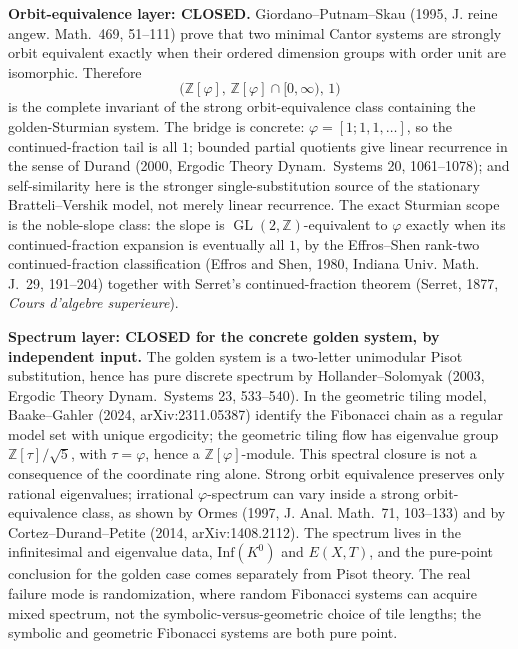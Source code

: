 \documentclass[11pt]{article}
\begin{document}
\textbf{Orbit-equivalence layer: CLOSED.}  Giordano--Putnam--Skau (1995, J. reine angew. Math.\ 469, 51--111) prove that two minimal Cantor systems are strongly orbit equivalent exactly when their ordered dimension groups with order unit are isomorphic.  Therefore
$$
  \bigl(\mathbb Z[\varphi],\,\mathbb Z[\varphi]\cap[0,\infty),\,1\bigr)
$$
is the complete invariant of the strong orbit-equivalence class containing the golden-Sturmian system.  The bridge is concrete: $\varphi=[1;1,1,\dots]$, so the continued-fraction tail is all $1$; bounded partial quotients give linear recurrence in the sense of Durand (2000, Ergodic Theory Dynam.\ Systems 20, 1061--1078); and self-similarity here is the stronger single-substitution source of the stationary Bratteli--Vershik model, not merely linear recurrence.  The exact Sturmian scope is the noble-slope class: the slope is $\operatorname{GL}(2,\mathbb Z)$-equivalent to $\varphi$ exactly when its continued-fraction expansion is eventually all $1$, by the Effros--Shen rank-two continued-fraction classification (Effros and Shen, 1980, Indiana Univ. Math. J.\ 29, 191--204) together with Serret's continued-fraction theorem (Serret, 1877, \emph{Cours d'algebre superieure}).

\textbf{Spectrum layer: CLOSED for the concrete golden system, by independent input.}  The golden system is a two-letter unimodular Pisot substitution, hence has pure discrete spectrum by Hollander--Solomyak (2003, Ergodic Theory Dynam.\ Systems 23, 533--540).  In the geometric tiling model, Baake--Gahler (2024, arXiv:2311.05387) identify the Fibonacci chain as a regular model set with unique ergodicity; the geometric tiling flow has eigenvalue group $\mathbb Z[\tau]/\sqrt5$, with $\tau=\varphi$, hence a $\mathbb Z[\varphi]$-module.  This spectral closure is not a consequence of the coordinate ring alone.  Strong orbit equivalence preserves only rational eigenvalues; irrational $\varphi$-spectrum can vary inside a strong orbit-equivalence class, as shown by Ormes (1997, J. Anal. Math.\ 71, 103--133) and by Cortez--Durand--Petite (2014, arXiv:1408.2112).  The spectrum lives in the infinitesimal and eigenvalue data, $\mathrm{Inf}(K^0)$ and $E(X,T)$, and the pure-point conclusion for the golden case comes separately from Pisot theory.  The real failure mode is randomization, where random Fibonacci systems can acquire mixed spectrum, not the symbolic-versus-geometric choice of tile lengths; the symbolic and geometric Fibonacci systems are both pure point.
\end{document}

